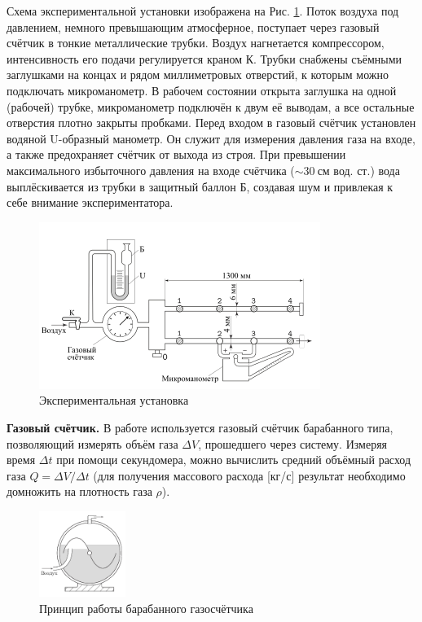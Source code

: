 \documentclass[a4paper, 12pt]{article}
\begin{document}
\par Схема экспериментальной установки изображена на Рис. \ref{ris4}. Поток воздуха
под давлением, немного превышающим атмосферное, поступает через газовый счётчик в тонкие металлические трубки. Воздух нагнетается компрессором, интенсивность его подачи регулируется краном К. Трубки снабжены съёмными заглушками на концах и рядом миллиметровых отверстий, к которым можно подключать микроманометр. В рабочем состоянии открыта заглушка на одной (рабочей) трубке, микроманометр подключён к двум её выводам, а все остальные отверстия плотно закрыты пробками.
Перед входом в газовый счётчик установлен водяной U-образный манометр. Он служит для измерения давления газа на входе, а также предохраняет счётчик от выхода из строя. При превышении максимального избыточного давления на входе счётчика ($\sim  30~\text{см вод. ст.}$) вода выплёскивается из трубки в защитный баллон Б, создавая шум и привлекая к себе внимание экспериментатора.
\begin{figure}[h!]
\begin{center}
\includegraphics[scale=1.2]{4.png}
\caption{Экспериментальная установка}
\label{ris4}
\end{center}
\end{figure}
\par {\bf Газовый счётчик.} В работе используется газовый счётчик барабанного
типа, позволяющий измерять объём газа $\Delta{V}$, прошедшего через систему. Измеряя время $\Delta{t}$ при помощи секундомера, можно вычислить средний объёмный расход газа $Q=\Delta{V}/\Delta{t}$ (для получения массового расхода [кг/с] результат необходимо домножить на плотность газа $\rho$).
\begin{figure}
\includegraphics[width=0.25\textwidth]{5.png}
\caption{Принцип работы барабанного газосчётчика}
\label{ris5}
\end{figure}
\end{document}
